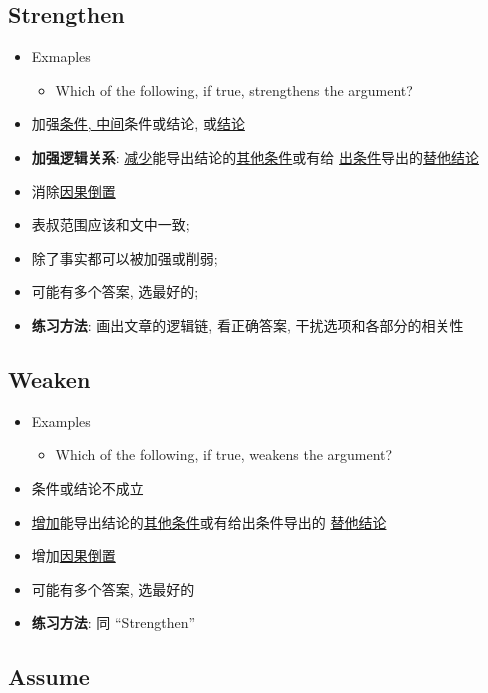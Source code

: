   \subsection{Strengthen}

    \begin{itemize}
      \item Exmaples
      \begin{itemize}
        \item Which of the following, if true, strengthens the argument?
      \end{itemize}

      \item 加强\uline{条件, 中间}条件或结论, 或\uline{结论}
      \item \textbf{加强逻辑关系}: \uline{减少}能导出结论的\uline{其他条件}或有给
      \uline{出条件}导出的\uline{替他结论}
      \item 消除\uline{因果倒置}
      \item 表叔范围应该和文中一致;
      \item 除了事实都可以被加强或削弱;
      \item 可能有多个答案, 选最好的;
      \item \textbf{练习方法}: 画出文章的逻辑链, 看正确答案, 干扰选项和各部分的相关性
    \end{itemize}

  \subsection{Weaken}

    \begin{itemize}
      \item Examples
      \begin{itemize}
        \item Which of the following, if true, weakens the argument?
      \end{itemize}

      \item 条件或结论不成立
      \item \uline{增加}能导出结论的\uline{其他条件}或有给出条件导出的
      \uline{替他结论}
      \item 增加\uline{因果倒置}
      \item 可能有多个答案, 选最好的
      \item \textbf{练习方法}: 同 “Strengthen”
    \end{itemize}

  \subsection{Assume}

